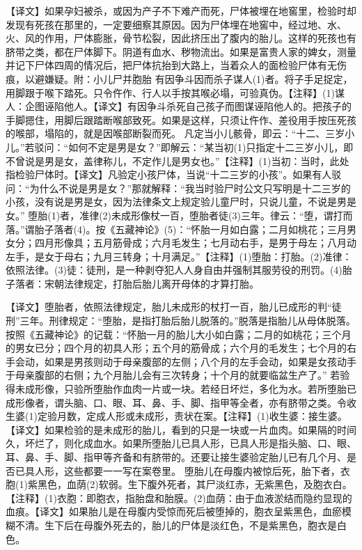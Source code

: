 \documentclass[12pt,UTF8]{ctexbook}
\begin{document}
【译文】如果孕妇被杀，或因为产子不下难产而死，尸体被埋在地窖里，检验时却发现有死孩在那里的，一定要细察其原因。因为尸体埋在地窖中，经过地、水、火、风的作用，尸体膨胀，骨节松裂，因此挤压出了腹内的胎儿。这样的死孩也有脐带之类，都在尸体脚下。阴道有血水、秽物流出。如果是富贵人家的婢女，测量并记下尸体四周的情况后，把尸体抗抬到大路上，当着众人的面检验尸体有无伤痕，以避嫌疑。附：小儿尸并胞胎
有因争斗因而杀子谋人(1)者。将子手足捉定，用脚跟于喉下踏死。只令仵作、行人以手按其喉必塌，可验真伪。【注释】(1)谋人：企图诬陷他人。【译文】有因争斗杀死自己孩子而图谋诬陷他人的。把孩子的手脚摁住，用脚后跟踏断喉部致死。如果是这样，只须让仵作、差役用手按压死孩的喉部，塌陷的，就是因喉部断裂而死。
凡定当小儿骸骨，即云：“十二、三岁小儿。”若驳问：“如何不定是男是女？”即解云：“某当初(1)只指定十二三岁小儿，即不曾说是男是女，盖律称儿，不定作儿是男女也。”【注释】(1)当初：当时，此处指检验尸体时。【译文】凡验定小孩尸体，当说“十二三岁的小孩”。如果有人驳问：“为什么不说是男是女？”那就解释：“我当时验尸时公文只写明是十二三岁的小孩，没有说是男是女，因为法律条文上规定验儿童尸时，只说儿童，不说是男是女。”
堕胎(1)者，准律(2)未成形像杖一百，堕胎者徒(3)三年。律云：“堕，谓打而落。”谓胎子落者(4)。按《五藏神论》(5)：“怀胎一月如白露；二月如桃花；三月男女分；四月形像具；五月筋骨成；六月毛发生；七月动右手，是男于母左；八月动左手，是女于母右；九月三转身；十月满足。”【注释】(1)堕胎：打胎。(2)准律：依照法律。(3)徒：徒刑，是一种剥夺犯人人身自由并强制其服劳役的刑罚。(4)胎子落者：宋朝法律规定，打胎后胎儿离开母体的才算打胎。

【译文】堕胎者，依照法律规定，胎儿未成形的杖打一百，胎儿已成形的判“徒刑”三年。刑律规定：“堕胎，是指打胎后胎儿脱落的。”脱落是指胎儿从母体脱落。按照《五藏神论》的记载：“怀胎一月的胎儿大小如白露；二月的如桃花；三个月的男女已分；四个月的初具人形；五个月的筋骨成；六个月的毛发生；七个月的右手会动，如果是男孩则动于母亲腹部的左侧；八个月的左手会动，如果是女孩动手于母亲腹部的右侧；九个月胎儿会有三次转身；十个月的就要临盆生产了。”
若验得未成形像，只验所堕胎作血肉一片或一块。若经日坏烂，多化为水。若所堕胎已成形像者，谓头脑、口、眼、耳、鼻、手、脚、指甲等全者，亦有脐带之类。令收生婆(1)定验月数，定成人形或未成形，责状在案。【注释】(1)收生婆：接生婆。【译文】如果检验的是未成形的胎儿，看到的只是一块或一片血肉。如果隔的时间久，坏烂了，则化成血水。如果所堕胎儿已具人形，已具人形是指头脑、口、眼、耳、鼻、手、脚、指甲等齐备和有脐带的。还要让接生婆验定胎儿已有几个月、是否已具人形，这些都要一一写在案卷里。
堕胎儿在母腹内被惊后死，胎下者，衣胞(1)紫黑色，血荫(2)软弱。生下腹外死者，其尸淡红赤，无紫黑色，及胞衣白。【注释】(1)衣胞：即胞衣，指胎盘和胎膜。(2)血荫：由于血液淤结而隐约显现的血痕。【译文】如果胎儿是在母腹内受惊而死后被堕掉的，胞衣呈紫黑色，血瘀模糊不清。生下后在母腹外死去的，胎儿的尸体是淡红色，不是紫黑色，胞衣是白色。
\end{document}

